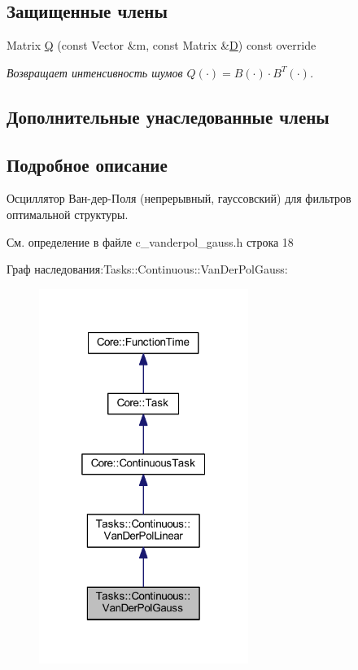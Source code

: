 \subsection*{Защищенные члены}
\begin{DoxyCompactItemize}
\item 
\hypertarget{class_tasks_1_1_continuous_1_1_van_der_pol_gauss_aefe0f9432c2c283fba65ca73e6092f28}{}\label{class_tasks_1_1_continuous_1_1_van_der_pol_gauss_aefe0f9432c2c283fba65ca73e6092f28} 
Matrix \hyperlink{class_tasks_1_1_continuous_1_1_van_der_pol_gauss_aefe0f9432c2c283fba65ca73e6092f28}{Q} (const Vector \&m, const Matrix \&\hyperlink{class_tasks_1_1_continuous_1_1_van_der_pol_linear_a07e8842a175006f214238a9f71e5ebdf}{D}) const override
\begin{DoxyCompactList}\small\item\em Возвращает интенсивность шумов $Q(\cdot) = B(\cdot) \cdot B^T(\cdot)$. \end{DoxyCompactList}\end{DoxyCompactItemize}
\subsection*{Дополнительные унаследованные члены}


\subsection{Подробное описание}
Осциллятор Ван-\/дер-\/Поля (непрерывный, гауссовский) для фильтров оптимальной структуры. 

См. определение в файле c\+\_\+vanderpol\+\_\+gauss.\+h строка 18



Граф наследования\+:Tasks\+:\+:Continuous\+:\+:Van\+Der\+Pol\+Gauss\+:\nopagebreak
\begin{figure}[H]
\begin{center}
\leavevmode
\includegraphics[width=193pt]{class_tasks_1_1_continuous_1_1_van_der_pol_gauss__inherit__graph}
\end{center}
\end{figure}


